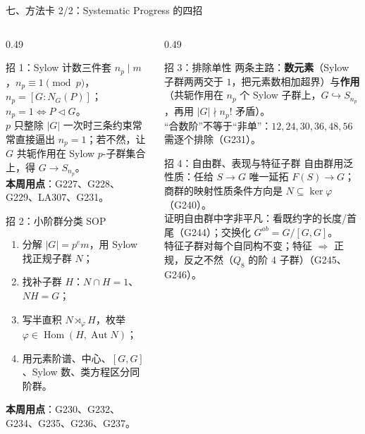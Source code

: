 \documentclass[aspectratio=169,10pt,fontset=none]{ctexbeamer}
\newcommand{\key}[1]{\textcolor{ink}{\bfseries #1}}
\begin{document}
\begin{frame}[t]{七、方法卡 2/2：Systematic Progress 的四招}
  \label{sec:methods2}
  \begin{columns}[T,onlytextwidth]
    \begin{column}{0.49\textwidth}
      \begin{block}{\footnotesize 招 1：Sylow 计数三件套}
        \scriptsize
        $n_p\mid m$，$n_p\equiv1\pmod p$，$n_p=[G:N_G(P)]$；$n_p=1\iff P\triangleleft G$。\\
        $p$ 只整除 $|G|$ 一次时三条约束常常直接逼出 $n_p=1$；若不然，让 $G$ 共轭作用在 Sylow $p$-子群集合上，得 $G\to S_{n_p}$。\\
        \key{本周用点}：G227、G228、G229、LA307、G231。
      \end{block}
      \begin{block}{\footnotesize 招 2：小阶群分类 SOP}
        \scriptsize
        \begin{enumerate}\setlength{\itemsep}{0pt}
          \item 分解 $|G|=p^em$，用 Sylow 找正规子群 $N$；
          \item 找补子群 $H$：$N\cap H=1$、$NH=G$；
          \item 写半直积 $N\rtimes_\varphi H$，枚举 $\varphi\in\operatorname{Hom}(H,\operatorname{Aut}N)$；
          \item 用元素阶谱、中心、$[G,G]$、Sylow 数、类方程区分同阶群。
        \end{enumerate}
        \key{本周用点}：G230、G232、G234、G235、G236、G237。
      \end{block}
    \end{column}
    \begin{column}{0.49\textwidth}
      \begin{block}{\footnotesize 招 3：排除单性}
        \scriptsize
        两条主路：\textbf{数元素}（Sylow 子群两两交于 $1$，把元素数相加超界）与\textbf{作用}（共轭作用在 $n_p$ 个 Sylow 子群上，$G\hookrightarrow S_{n_p}$，再用 $|G|\nmid n_p!$ 矛盾）。\\
        “合数阶”不等于“非单”：$12,24,30,36,48,56$ 需逐个排除（G231）。
      \end{block}
      \begin{block}{\footnotesize 招 4：自由群、表现与特征子群}
        \scriptsize
        自由群用泛性质：任给 $S\to G$ 唯一延拓 $F(S)\to G$；商群的映射性质条件方向是 $N\subseteq\ker\varphi$（G240）。\\
        证明自由群中字非平凡：看既约字的长度/首尾（G244）；交换化 $G^{ab}=G/[G,G]$。\\
        特征子群对每个自同构不变；特征 $\Rightarrow$ 正规，反之不然（$Q_8$ 的阶 4 子群）（G245、G246）。
      \end{block}
    \end{column}
  \end{columns}
\end{frame}
\end{document}
